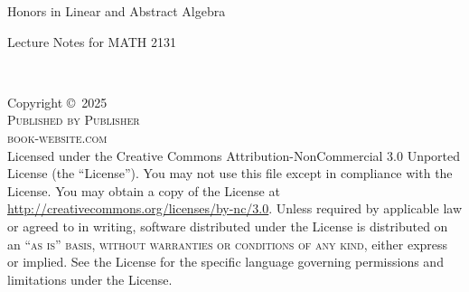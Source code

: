 \documentclass[
	11pt, %
	fleqn, %
	a4paper, %
]{LegrandOrangeBook}
\begin{document}

\titlepage %
	{ %
		\centering\sffamily %
		\vspace{3cm}
		{\huge\color{ocre} Honors in Linear and Abstract Algebra\par} %
		\vspace{2cm} %
		{Lecture Notes for MATH 2131\par} %
		\vfill
	}


\thispagestyle{empty} %

~\vfill %

\noindent Copyright \copyright\ 2025 \\ %

\noindent \textsc{Published by Publisher}\\ %

\noindent \textsc{book-website.com}\\ %

\noindent Licensed under the Creative Commons Attribution-NonCommercial 3.0 Unported License (the ``License''). You may not use this file except in compliance with the License. You may obtain a copy of the License at \url{http://creativecommons.org/licenses/by-nc/3.0}. Unless required by applicable law or agreed to in writing, software distributed under the License is distributed on an \textsc{``as is'' basis, without warranties or conditions of any kind}, either express or implied. See the License for the specific language governing permissions and limitations under the License.\\ %
\end{document}
